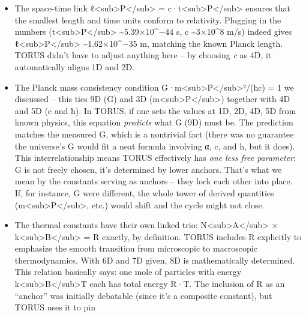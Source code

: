 \documentclass[
]{article}
\begin{document}
\begin{itemize}
\item
  The space-time link
  ℓ\textless sub\textgreater P\textless/sub\textgreater{} =
  c·t\textless sub\textgreater P\textless/sub\textgreater\hspace{0pt}
  ensures that the smallest length and time units conform to relativity.
  Plugging in the numbers
  (t\textless sub\textgreater P\textless/sub\textgreater{}
  \textasciitilde5.39×10\^{}−44 s, c \textasciitilde3×10\^{}8 m/s)
  indeed gives ℓ\textless sub\textgreater P\textless/sub\textgreater{}
  \textasciitilde1.62×10\^{}−35 m, matching the known Planck length.
  TORUS didn't have to adjust anything here -- by choosing \emph{c} as
  4D, it automatically aligns 1D and 2D.
\item
  The Planck mass consistency condition
  G·m\textless sub\textgreater P\textless/sub\textgreater²/(ħc) =
  1\hspace{0pt} we discussed -- this ties 9D (G) and 3D
  (m\textless sub\textgreater P\textless/sub\textgreater) together with
  4D and 5D (c and ħ). In TORUS, if one sets the values at 1D, 2D, 4D,
  5D from known physics, this equation \emph{predicts} what G (9D) must
  be. The prediction matches the measured G, which is a nontrivial fact
  (there was no guarantee the universe's G would fit a neat formula
  involving α, c, and h, but it does). This interrelationship means
  TORUS effectively has \emph{one less free parameter}: G is not freely
  chosen, it's determined by lower anchors\hspace{0pt}. That's what we
  mean by the constants serving as anchors -- they lock each other into
  place. If, for instance, G were different, the whole tower of derived
  quantities (m\textless sub\textgreater P\textless/sub\textgreater,
  etc.) would shift and the cycle might not close.
\item
  The thermal constants have their own linked trio:
  N\textless sub\textgreater A\textless/sub\textgreater{} ×
  k\textless sub\textgreater B\textless/sub\textgreater{} = R exactly,
  by definition. TORUS includes R explicitly to emphasize the smooth
  transition from microscopic to macroscopic thermodynamics\hspace{0pt}.
  With 6D and 7D given, 8D is mathematically determined. This relation
  basically says: one mole of particles with energy
  k\textless sub\textgreater B\textless/sub\textgreater T each has total
  energy R·T. The inclusion of R as an ``anchor'' was initially
  debatable (since it's a composite constant), but TORUS uses it to pin

\end{itemize}
\end{document}
